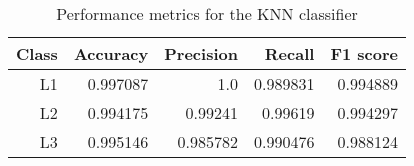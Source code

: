 \begin{table}  
    \centering
    \caption{Performance metrics for the KNN classifier}
    \label{tab:results_knncs}
    \begin{tabular}{rrrrr}    
        \hline\hline    
        \textbf{Class} & \textbf{Accuracy} & \textbf{Precision} & \textbf{Recall} & \textbf{F1 score} \\ \hline    L1 & 0.997087 & 1.0 & 0.989831 & 0.994889 \\\     L2 & 0.994175 & 0.99241 & 0.99619 & 0.994297 \\     L3 & 0.995146 & 0.985782 & 0.990476 & 0.988124 \\ \hline\hline  
    \end{tabular}\end{table}